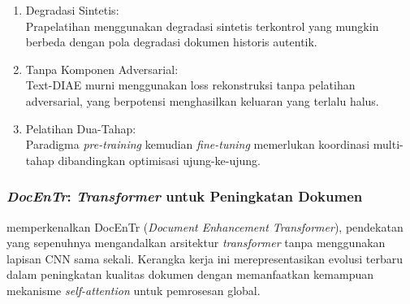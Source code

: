 \documentclass[12pt,a4paper]{article}
\begin{document}
\begin{enumerate}[leftmargin=*, labelsep=0.5em, itemindent=0pt, label=\arabic*., topsep=0pt, partopsep=0pt]
\begin{enumerate}[leftmargin=1.5em, labelsep=0.5em, itemindent=0pt, label=\alph*., topsep=0pt, parsep=0pt, itemsep=0pt]
      \item Degradasi Sintetis: \mbox{}\\[0.1em]
            Prapelatihan menggunakan degradasi sintetis terkontrol yang mungkin berbeda dengan pola degradasi dokumen historis autentik.

      \item Tanpa Komponen Adversarial: \mbox{}\\[0.1em]
            Text-DIAE murni menggunakan loss rekonstruksi tanpa pelatihan adversarial, yang berpotensi menghasilkan keluaran yang terlalu halus.

      \item Pelatihan Dua-Tahap: \mbox{}\\[0.1em]
            Paradigma \textit{pre-training} kemudian \textit{fine-tuning} memerlukan koordinasi multi-tahap dibandingkan optimisasi ujung-ke-ujung.
\end{enumerate}

\end{enumerate}

\subsubsection{\textit{DocEnTr}: \textit{Transformer} untuk Peningkatan Dokumen}
\label{subsubsec:docentr}

\textcite{souibgui2022docentr} memperkenalkan DocEnTr (\textit{Document Enhancement Transformer}), pendekatan yang sepenuhnya mengandalkan arsitektur \textit{transformer} tanpa menggunakan lapisan CNN sama sekali. Kerangka kerja ini merepresentasikan evolusi terbaru dalam peningkatan kualitas dokumen dengan memanfaatkan kemampuan mekanisme \textit{self-attention} untuk pemrosesan global.
\end{document}
